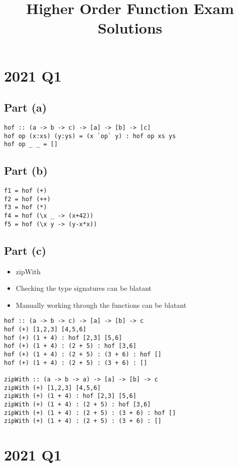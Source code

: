 \documentclass[11pt]{article}
\date{}
\title{Higher Order Function Exam Solutions}
\begin{document}
\maketitle

\section{2021 Q1}
\label{sec:org76d275d}
\subsection{Part (a)}
\label{sec:org089a581}
\begin{verbatim}
hof :: (a -> b -> c) -> [a] -> [b] -> [c]
hof op (x:xs) (y:ys) = (x `op` y) : hof op xs ys
hof op _ _ = []
\end{verbatim}
\subsection{Part (b)}
\label{sec:orgef09777}
\begin{verbatim}
f1 = hof (+)
f2 = hof (++)
f3 = hof (*)
f4 = hof (\x _ -> (x+42))
f5 = hof (\x y -> (y-x*x))
\end{verbatim}
\subsection{Part (c)}
\label{sec:orgf085006}
\begin{itemize}
\item zipWith
\item Checking the type signatures can be blatant
\item Manually working through the functions can be blatant
\end{itemize}
\begin{verbatim}
hof :: (a -> b -> c) -> [a] -> [b] -> c
hof (+) [1,2,3] [4,5,6]
hof (+) (1 + 4) : hof [2,3] [5,6]
hof (+) (1 + 4) : (2 + 5) : hof [3,6]
hof (+) (1 + 4) : (2 + 5) : (3 + 6) : hof []
hof (+) (1 + 4) : (2 + 5) : (3 + 6) : []

zipWith :: (a -> b -> a) -> [a] -> [b] -> c
zipWith (+) [1,2,3] [4,5,6]
zipWith (+) (1 + 4) : hof [2,3] [5,6]
zipWith (+) (1 + 4) : (2 + 5) : hof [3,6]
zipWith (+) (1 + 4) : (2 + 5) : (3 + 6) : hof []
zipWith (+) (1 + 4) : (2 + 5) : (3 + 6) : []
\end{verbatim}
\newpage
\section{2021 Q1}
\label{sec:org1296ebc}
\end{document}
